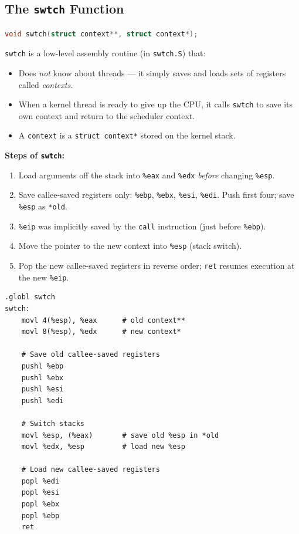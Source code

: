 \documentclass[11pt]{article}
\begin{document}
\subsection{The \texttt{swtch} Function}

\begin{lstlisting}[language=C, caption={swtch signature}]
void swtch(struct context**, struct context*);
\end{lstlisting}

\texttt{swtch} is a low-level assembly routine (in \texttt{swtch.S}) that:
\begin{itemize}
    \item Does \emph{not} know about threads --- it simply saves and loads sets of registers called \emph{contexts}.
    \item When a kernel thread is ready to give up the CPU, it calls \texttt{swtch} to save its own context and return to the scheduler context.
    \item A \texttt{context} is a \texttt{struct context*} stored on the kernel stack.
\end{itemize}

\textbf{Steps of \texttt{swtch}:}
\begin{enumerate}
    \item Load arguments off the stack into \texttt{\%eax} and \texttt{\%edx} \emph{before} changing \texttt{\%esp}.
    \item Save callee-saved registers only: \texttt{\%ebp}, \texttt{\%ebx}, \texttt{\%esi}, \texttt{\%edi}. Push first four; save \texttt{\%esp} as \texttt{*old}.
    \item \texttt{\%eip} was implicitly saved by the \texttt{call} instruction (just before \texttt{\%ebp}).
    \item Move the pointer to the new context into \texttt{\%esp} (stack switch).
    \item Pop the new callee-saved registers in reverse order; \texttt{ret} resumes execution at the new \texttt{\%eip}.
\end{enumerate}

\begin{lstlisting}[language={[x86masm]Assembler}, caption={swtch.S}]
.globl swtch
swtch:
    movl 4(%esp), %eax      # old context**
    movl 8(%esp), %edx      # new context*

    # Save old callee-saved registers
    pushl %ebp
    pushl %ebx
    pushl %esi
    pushl %edi

    # Switch stacks
    movl %esp, (%eax)       # save old %esp in *old
    movl %edx, %esp         # load new %esp

    # Load new callee-saved registers
    popl %edi
    popl %esi
    popl %ebx
    popl %ebp
    ret
\end{lstlisting}
\end{document}
